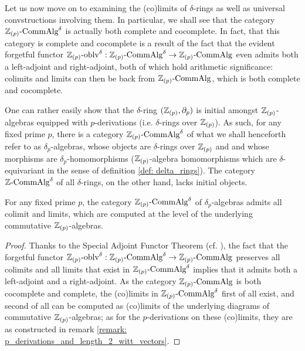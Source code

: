             Let us now move on to examining the (co)limits of $\delta$-rings as well as universal convstructions involving them. In particular, we shall see that the category $\mathbb{Z}_{(p)}\text{-}\mathrm{Comm}\mathrm{Alg}^{\delta}$ is actually both complete and cocomplete. In fact, that this category is complete and cocomplete is a result of the fact that the evident forgetful functor $\mathbb{Z}_{(p)}\text{-}\mathrm{oblv}^{\delta}: \mathbb{Z}_{(p)}\text{-}\mathrm{Comm}\mathrm{Alg}^{\delta} \to \mathbb{Z}_{(p)}\text{-}\mathrm{Comm}\mathrm{Alg}$ even admits both a left-adjoint and right-adjoint, both of which hold arithmetic significance: colimits and limits can then be  back from $\mathbb{Z}_{(p)}\text{-}\mathrm{Comm}\mathrm{Alg}$, which is both complete and cocomplete.
            \begin{remark} \label{remark: initial_delta_ring}
                One can rather easily show that the $\delta$-ring $(\mathbb{Z}_{(p)}, \partial_p)$ is initial amongst $\mathbb{Z}_{(p)}$-algebras equipped with $p$-derivations (i.e. $\delta$-rings over $\mathbb{Z}_{(p)}$). As such, for any fixed prime $p$, there is a category $\mathbb{Z}_{(p)}\text{-}\mathrm{Comm}\mathrm{Alg}^{\delta}$ of what we shall henceforth refer to as $\delta_p$-algebras, whose objects are $\delta$-rings over $\mathbb{Z}_{(p)}$ and and whose morphisms are $\delta_p$-homomorphisms ($\mathbb{Z}_{(p)}$-algebra homomorphisms which are $\delta$-equivariant in the sense of definition \ref{def: delta_rings}). The  category $\mathbb{Z}\text{-}\mathrm{Comm}\mathrm{Alg}^{\delta}$ of all $\delta$-rings, on the other hand, lacks initial objects. 
            \end{remark}
            \begin{remark} \label{remark: p_derivations_and_length_2_witt_vectors} 
                
            \end{remark}
            \begin{proposition} \label{prop: (co)limits_of_delta_rings}
                For any fixed prime $p$, the category $\mathbb{Z}_{(p)}\text{-}\mathrm{Comm}\mathrm{Alg}^{\delta}$ of $\delta_p$-algebras admits all colimit and limits, which are computed at the level of the underlying commutative $\mathbb{Z}_{(p)}$-algebras. 
            \end{proposition}
                \begin{proof}
                    Thanks to the Special Adjoint Functor Theorem (cf. \cite{nlab:adjoint_functor_theorem}), the fact that the forgetful functor $\mathbb{Z}_{(p)}\text{-}\mathrm{oblv}^{\delta}: \mathbb{Z}_{(p)}\text{-}\mathrm{Comm}\mathrm{Alg}^{\delta} \to \mathbb{Z}_{(p)}\text{-}\mathrm{Comm}\mathrm{Alg}$ preserves all colimits and all limits that exist in $\mathbb{Z}_{(p)}\text{-}\mathrm{Comm}\mathrm{Alg}^{\delta}$ implies that it admits both a left-adjoint and a right-adjoint. As the category $\mathbb{Z}_{(p)}\text{-}\mathrm{Comm}\mathrm{Alg}$ is both cocomplete and complete, the (co)limits in $\mathbb{Z}_{(p)}\text{-}\mathrm{Comm}\mathrm{Alg}^{\delta}$ first of all exist, and second of all can be computed as (co)limits of the underlying diagrams of commutative $\mathbb{Z}_{(p)}$-algebras; as for the $p$-derivations on these (co)limits, they are as constructed in remark \ref{remark: p_derivations_and_length_2_witt_vectors}.
                \end{proof}
